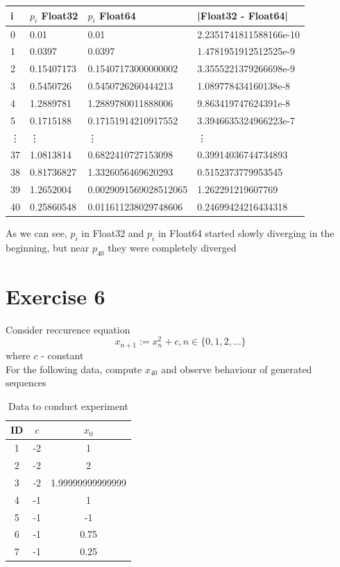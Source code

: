 \documentclass[12pt]{article}
\begin{document}
\begin{table}[h]
    \centering
    \begin{tabular}{|l|l|l|l|}
    \hline
        i & $p_i$ Float32 & $p_i$ Float64 & |Float32 - Float64| \\ \hline
        0 & 0.01 & 0.01 & 2.2351741811588166e-10 \\ \hline
        1 & 0.0397 & 0.0397 & 1.4781951912512525e-9 \\ \hline
        2 & 0.15407173 & 0.15407173000000002 & 3.3555221379266698e-9 \\ \hline
        3 & 0.5450726 & 0.5450726260444213 & 1.089778434160138e-8 \\ \hline
        4 & 1.2889781 & 1.2889780011888006 & 9.863419747624391e-8 \\ \hline
        5 & 0.1715188 & 0.17151914210917552 & 3.3946635324966223e-7 \\ \hline
        \vdots & \vdots & \vdots & \vdots \\ \hline
        37 & 1.0813814 & 0.6822410727153098 & 0.39914036744734893 \\ \hline
        38 & 0.81736827 & 1.3326056469620293 & 0.5152373779953545 \\ \hline
        39 & 1.2652004 & 0.0029091569028512065 & 1.262291219607769 \\ \hline
        40 & 0.25860548 & 0.011611238029748606 & 0.24699424216434318 \\ \hline
    \end{tabular}
\end{table}
As we can see, $p_i$ in Float32 and $p_i$ in Float64 started slowly diverging in the beginning, but near $p_{40}$ they were completely diverged 
\section*{Exercise 6}
Consider reccurence equation
\begin{equation*}
    x_{n+1} := x_n^2 + c, n \in \{0, 1, 2, \dots\}
\end{equation*} 
where $c$ - constant\\
For the following data, compute $x_{40}$ and observe behaviour of generated sequences
\begin{table}[!ht]
    \centering
    \begin{tabular}{ccc}
    \hline
        ID & $c$ & $x_0$ \\ \hline
        1 & -2 & 1 \\ 
        2 & -2 & 2 \\ 
        3 & -2 & 1.99999999999999 \\ 
        4 & -1 & 1 \\ 
        5 & -1 & -1 \\ 
        6 & -1 & 0.75 \\ 
        7 & -1 & 0.25 \\ \hline
    \end{tabular}
    \caption{Data to conduct experiment}
\end{table}
\end{document}
